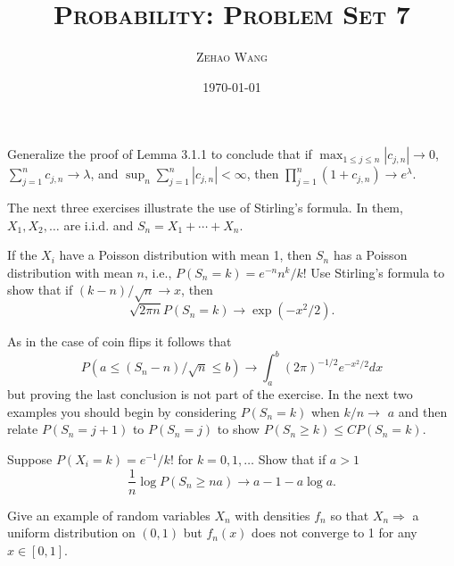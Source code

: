 \documentclass[en, normal, 11pt, black]{elegantnote}
\title{\textsc{Probability: Problem Set 7}}
\author{\textsc{Zehao Wang}}
\date{\today}
\newenvironment{exercise}[1]{\begin{tcolorbox}[colback=black!15, colframe=black!80, breakable, title=#1]}{\end{tcolorbox}}
\begin{document}
    \maketitle

    \begin{exercise}{3.1.1}
        Generalize the proof of Lemma 3.1.1 to conclude that if $\max _{1 \leq j \leq n}\left|c_{j, n}\right| \rightarrow 0$, $\sum_{j=1}^{n} c_{j, n} \rightarrow \lambda$, and $\sup _{n} \sum_{j=1}^{n}\left|c_{j, n}\right|<\infty$, then $\prod_{j=1}^{n}\left(1+c_{j, n}\right) \rightarrow e^{\lambda}$. 
    \end{exercise}

    The next three exercises illustrate the use of Stirling's formula. In them, $X_{1}, X_{2}, \ldots$ are i.i.d. and $S_{n}=X_{1}+\cdots+X_{n}$. 

    \begin{exercise}{3.1.2}
        If the $X_{i}$ have a Poisson distribution with mean 1, then $S_{n}$ has a Poisson distribution with mean $n$, i.e., $P\left(S_{n}=k\right)=e^{-n} n^{k} / k !$ Use Stirling's formula to show that if $(k-n) / \sqrt{n} \rightarrow x$, then
        \[
            \sqrt{2 \pi n} P\left(S_{n}=k\right) \rightarrow \exp \left(-x^{2} / 2\right). 
        \]
    \end{exercise}

    As in the case of coin flips it follows that
    \[
        P\left(a \leq\left(S_{n}-n\right) / \sqrt{n} \leq b\right) \rightarrow \int_{a}^{b}(2 \pi)^{-1 / 2} e^{-x^{2} / 2} d x
    \]
    but proving the last conclusion is not part of the exercise. In the next two examples you should begin by considering $P\left(S_{n}=k\right)$ when $k / n \rightarrow$ $a$ and then relate $P\left(S_{n}=j+1\right)$ to $P\left(S_{n}=j\right)$ to show $P\left(S_{n} \geq k\right) \leq C P\left(S_{n}=k\right)$. 

    \begin{exercise}{3.1.4}
        Suppose $P\left(X_{i}=k\right)=e^{-1} / k !$ for $k=0,1, \ldots$ Show that if $a>1$
        \[
            \frac{1}{n} \log P\left(S_{n} \geq n a\right) \rightarrow a-1-a \log a. 
        \]
    \end{exercise}

    \begin{exercise}{3.2.1}
        Give an example of random variables $X_{n}$ with densities $f_{n}$ so that $X_{n} \Rightarrow$ a uniform distribution on $(0,1)$ but $f_{n}(x)$ does not converge to 1 for any $x \in[0,1]$. 
    \end{exercise}
\end{document}
